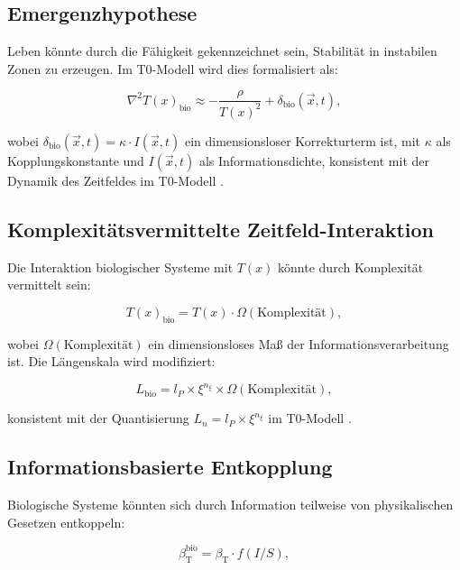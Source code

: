 \documentclass[12pt,a4paper]{article}
\newcommand{\Tfield}{T(x)}
\newcommand{\betaT}{\beta_{\text{T}}}
\begin{document}
	\subsection{Emergenzhypothese}
	
	Leben könnte durch die Fähigkeit gekennzeichnet sein, Stabilität in instabilen Zonen zu erzeugen. Im T0-Modell wird dies formalisiert als:
	
	\begin{equation}
		\nabla^2\Tfield_{\text{bio}} \approx -\frac{\rho}{\Tfield^2} + \delta_{\text{bio}}(\vec{x}, t),
	\end{equation}
	
	wobei $\delta_{\text{bio}}(\vec{x}, t) = \kappa \cdot I(\vec{x}, t)$ ein dimensionsloser Korrekturterm ist, mit $\kappa$ als Kopplungskonstante und $I(\vec{x}, t)$ als Informationsdichte, konsistent mit der Dynamik des Zeitfeldes im T0-Modell \cite{pascher_nateinheiten_2025}.
	
	\subsection{Komplexitätsvermittelte Zeitfeld-Interaktion}
	
	Die Interaktion biologischer Systeme mit $\Tfield$ könnte durch Komplexität vermittelt sein:
	
	\begin{equation}
		\Tfield_{\text{bio}} = \Tfield \cdot \Omega(\text{Komplexität}),
	\end{equation}
	
	wobei $\Omega(\text{Komplexität})$ ein dimensionsloses Maß der Informationsverarbeitung ist. Die Längenskala wird modifiziert:
	
	\begin{equation}
		L_{\text{bio}} = l_P \times \xi^{n_\xi} \times \Omega(\text{Komplexität}),
	\end{equation}
	
	konsistent mit der Quantisierung $L_n = l_P \times \xi^{n_\xi}$ im T0-Modell \cite{pascher_nateinheiten_2025}.
	
	\subsection{Informationsbasierte Entkopplung}
	
	Biologische Systeme könnten sich durch Information teilweise von physikalischen Gesetzen entkoppeln:
	
	\begin{equation}
		\betaT^{\text{bio}} = \betaT \cdot f(I/S),
	\end{equation}
	
\end{document}
